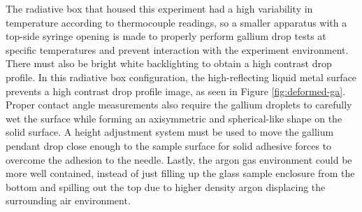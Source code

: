 The radiative box that housed this experiment had a high variability in temperature according to thermocouple readings, so a smaller apparatus with a top-side syringe opening is made to properly perform gallium drop tests at specific temperatures and prevent interaction with the experiment environment. There must also be bright white backlighting to obtain a high contrast drop profile. In this radiative box configuration, the high-reflecting liquid metal surface prevents a high contrast drop profile image, as seen in Figure \ref{fig:deformed-ga}. Proper contact angle measurements also require the gallium droplets to carefully wet the surface while forming an axisymmetric and spherical-like shape on the solid surface. A height adjustment system must be used to move the gallium pendant drop close enough to the sample surface for solid adhesive forces to overcome the adhesion to the needle. Lastly, the argon gas environment could be more well contained, instead of just filling up the glass sample enclosure from the bottom and spilling out the top due to higher density argon displacing the surrounding air environment. 

